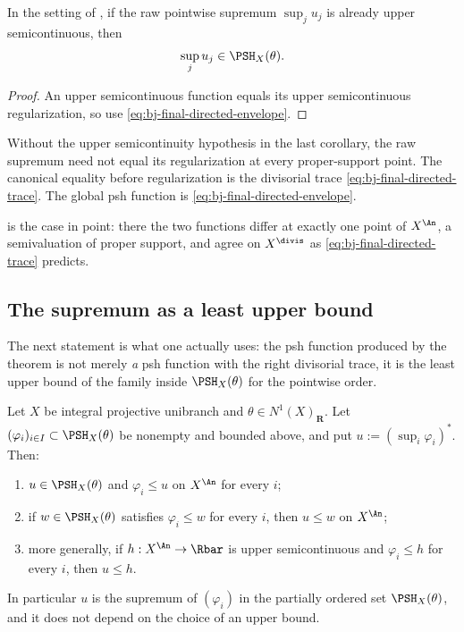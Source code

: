 \begin{corollary}\label{cor:bj-final-usc-increasing-limit}
In the setting of , if the raw pointwise
supremum $\sup_j u_j$ is already upper semicontinuous, then
\[
                         \sup_j u_j\in\PSH_X(\theta).
\]
\end{corollary}

\begin{proof}
An upper semicontinuous function equals its upper semicontinuous
regularization, so use \eqref{eq:bj-final-directed-envelope}.
\end{proof}

\begin{remark}
\label{rem:ch45-directed-pointwise}
Without the upper semicontinuity hypothesis in the last corollary, the raw
supremum need not equal its regularization at every proper-support point.
The canonical equality before regularization is the divisorial trace
\eqref{eq:bj-final-directed-trace}.
The global psh function is \eqref{eq:bj-final-directed-envelope}.
\end{remark}

 is the case in point: there the two functions
differ at exactly one point of $X^{\An}$, a semivaluation of proper
support, and agree on $X^{\divis}$ as
\eqref{eq:bj-final-directed-trace} predicts.

\subsection{The supremum as a least upper bound}
\label{sec:ch45-lub}

The next statement is what one actually uses: the psh function produced by
the theorem is not merely \emph{a} psh function with the right divisorial
trace, it is the least upper bound of the family inside $\PSH_X(\theta)$
for the pointwise order.

\begin{proposition}
\label{prop:ch45-lub}
Let $X$ be integral projective unibranch and
$\theta\in N^1(X)_{\mathbf R}$.  Let
$(\varphi_i)_{i\in I}\subset\PSH_X(\theta)$ be nonempty and bounded above,
and put $u:=(\sup_i\varphi_i)^*$.  Then:
\begin{enumerate}
\item\label{itm:ch45-lub:upper}
      $u\in\PSH_X(\theta)$ and $\varphi_i\le u$ on $X^{\An}$ for every
      $i$;
\item\label{itm:ch45-lub:least}
      if $w\in\PSH_X(\theta)$ satisfies $\varphi_i\le w$ for every
      $i$, then $u\le w$ on $X^{\An}$;
\item\label{itm:ch45-lub:usc}
      more generally, if $h:X^{\An}\to\Rbar$ is upper semicontinuous and
      $\varphi_i\le h$ for every $i$, then $u\le h$.
\end{enumerate}
In particular $u$ is the supremum of $(\varphi_i)$ in the partially
ordered set $\PSH_X(\theta)$, and it does not depend on the choice of an
upper bound.
\end{proposition}


